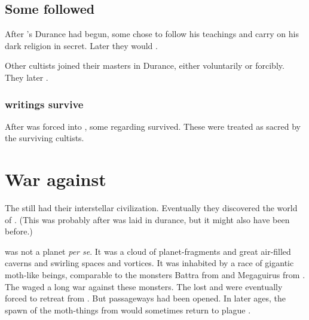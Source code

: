 \subsection{Some \ophidians followed \Sethicus}
After \Sethicus's Durance had begun, some \ophidians chose to follow his teachings and carry on his dark religion in secret. 
Later they would . 

Other \Sethican cultists joined their \draconian masters in Durance, either voluntarily or forcibly. 
They later . 




\subsubsection{\Sethican writings survive}
After \Sethicus was forced into , some  regarding  survived. 
These were treated as sacred by the surviving \Sethican cultists. 















\section{War against \Shuggon}
\index{\Shuggon}
The \ophidians still had their interstellar civilization. 
Eventually they discovered the world of \Shuggon. 
(This was probably after \Sethicus was laid in durance, but it might also have been before.)

\Shuggon was not a planet \emph{per se}. 
It was a cloud of planet-fragments and great air-filled caverns and swirling spaces and vortices. 
It was inhabited by a race of gigantic moth-like beings, comparable to the monsters Battra from \cite{Movie:GodzillaVsMothra} and Megaguirus from \cite{Movie:GodzillaVsMegaguirus}. 
The \ophidians waged a long war against these monsters.
The \ophidians lost and were eventually forced to retreat from \Shuggon. 
But passageways had been opened. 
In later ages, the spawn of the moth-things from \Shuggon would sometimes return to plague \Miith. 

